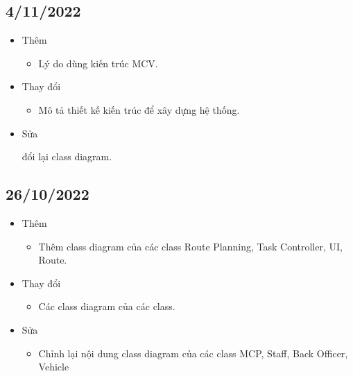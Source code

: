     \subsection{4/11/2022}
    \begin{itemize}
        \item Thêm
            \begin{itemize}
                \item Lý do dùng kiến trúc MCV. 
            \end{itemize}
        \item Thay đổi
            \begin{itemize}
                \itemClass Diagram cho task assignment module
                \item Mô tả thiết kế kiến trúc để xây dựng hệ thống.
            \end{itemize}
        \item Sửa
            \begin{itemize}
                \itemThay đổi lại class diagram. 
            \end{itemize}
    \end{itemize}
    \subsection{26/10/2022}
    \begin{itemize}
        \item Thêm
            \begin{itemize}
                \item Thêm class diagram của các class Route Planning, Task Controller, UI, Route.
            \end{itemize}
        \item Thay đổi
            \begin{itemize}
                \item Các class diagram của các class. 
            \end{itemize}
        \item Sửa
            \begin{itemize}
                \item  Chỉnh lại nội dung class diagram của các class MCP, Staff, Back Officer, Vehicle
            \end{itemize}
    \end{itemize}

